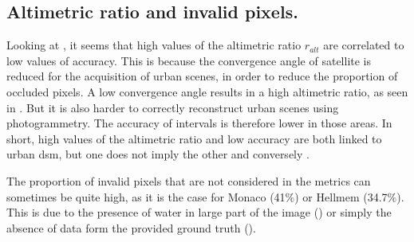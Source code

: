 \subsection{Altimetric ratio and invalid pixels.}
Looking at , it seems that high values of the altimetric ratio $r_{alt}$ are correlated to low values of accuracy. This is because the convergence angle of satellite is reduced for the acquisition of urban scenes, in order to reduce the proportion of occluded pixels. A low convergence angle results in a high altimetric ratio, as seen in . But it is also harder to correctly reconstruct urban scenes using photogrammetry. The accuracy of intervals is therefore lower in those areas. In short, high values of the altimetric ratio and low accuracy are both linked to urban \acrshort{dsm}, but one does not imply the other and conversely .

The proportion of invalid pixels that are not considered in the metrics can sometimes be quite high, as it is the case for Monaco (41$\%$) or Hellmem (34.7$\%$). This is due to the presence of water in large part of the image () or simply the absence of data form the provided ground truth ().

\marquepage
\youshallnotpass

